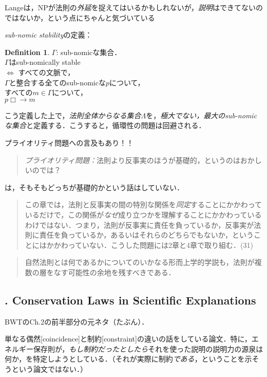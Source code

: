 \documentclass[dvipdfmx,twoside,11pt,uplatex]{jsarticle}
\theoremstyle{definition}
\newtheorem{dfn}{Definition}
\begin{document}
Langeは，NPが法則の\emph{外延}を捉えてはいるかもしれないが，\emph{説明}はできてないのではないか，という点にちゃんと気づいている\citep[Sect.1,6]{Lange2009lawmakers}

\emph{sub-nomic stability}の定義\citep[29]{Lange2009lawmakers}：
\begin{dfn}
    $\Gamma$: sub-nomicな集合．\\
    $\Gamma$はsub-nomically stable\\
    $\Longleftrightarrow$ すべての文脈で，\\
    $\Gamma$と整合する全てのsub-nomicな$p$について，\\
    すべての$m\in\Gamma$について，\\
    $p\Box\rightarrow m$
\end{dfn}
こう定義した上で，\emph{法則全体からなる集合}$\Lambda$を，\emph{極大でない，最大のsub-nomicな集合}と定義する．こうすると，循環性の問題は回避される．

プライオリティ問題への言及もあり！！
\begin{quote}
    \emph{プライオリティ問題：}法則より反事実のほうが基礎的，というのはおかしいのでは？
\end{quote}
\citet[31]{Lange2009lawmakers}は，そもそもどっちが基礎的かという話はしていない．
\begin{quote}
    この章では，法則と反事実の間の特別な関係を\emph{同定}することにかかわっているだけで，この関係が\emph{なぜ}成り立つかを理解することにかかわっているわけではない．つまり，法則が反事実に責任を負っているか，反事実が法則に責任を負っているか，あるいはそれらのどちらでもないか，ということにはかかわっていない．こうした問題には2章と4章で取り組む．(31)
\end{quote}

\begin{quote}
    自然法則とは何であるかについてのいかなる形而上学的学説も，法則が複数の層をなす可能性の余地を残すべきである．\citep[41]{Lange2009lawmakers}
\end{quote}

\subsection{\cite{Lange2011}. Conservation Laws in Scientific Explanations}
BWTのCh.2の前半部分の元ネタ（たぶん）．

単なる偶然[coincidence]と制約[constraint]の違いの話をしている論文．特に，エネルギー保存則が，\emph{もし制約だったとしたら}それを使った説明の説明力の源泉は何か，を特定しようとしている．（それが実際に制約\emph{である}，ということを示そうという論文ではない．）
\end{document}
